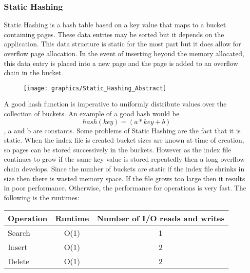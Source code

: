 \documentclass[letterpaper, 12pt]{article}
\begin{document}
\subsubsection{Static Hashing}
Static Hashing is a hash table based on a key value that maps to a bucket containing pages. These
data entries may be sorted but it depends on the application. This data structure is static
for the most part but it does allow for overflow page allocation. In the event of inserting
beyond the memory allocated, this data entry is placed into a new page and the page is added
to an overflow chain in the bucket.
\par\vspace{\baselineskip}
\begin{figure}
  \centering
  \texttt{[image: graphics/Static\_Hashing\_Abstract]}
\end{figure}

A good hash function is imperative to uniformly distribute values over the collection of buckets.
An example of a good hash would be \[hash(key) = (a*key + b)\], a and b are constants. Some problems
of Static Hashing are the fact that it is static. When the index file is created bucket sizes
are known at time of creation, so pages can be stored successively in the buckets. However
as the index file continues to grow if the same key value is stored repeatedly then a long
overflow chain develops. Since the number of buckets are static if the index file shrinks
in size then there is wasted memory space. If the file grows too large then it results in
poor performance. Otherwise, the performance for operations is very fast. The following
is the runtimes:

\par\vspace{\baselineskip}

\begin{center}
\begin{tabular}{l | c | c}
  \hline
  Operation & Runtime & Number of I/O reads and writes \\ \hline \hline
  Search & O(1) & 1  \\ \hline
  Insert & O(1) & 2  \\ \hline
  Delete & O(1) & 2  \\ \hline
\end{tabular}
\end{center}

\par\vspace{\baselineskip}
\end{document}
